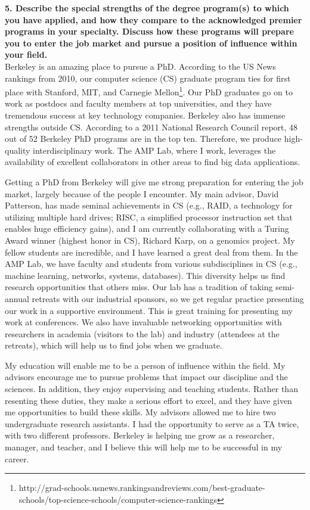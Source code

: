 \documentclass{article}
\begin{document}
\pagestyle{plain}

\noindent\textbf{5.  Describe the special strengths of the degree program(s) to which you have applied, and how they compare to the acknowledged premier programs in your specialty. Discuss how these programs will prepare you to enter the job market and pursue a position of influence within your field.}\\

Berkeley is an amazing place to pursue a PhD.
According to the US News rankings from 2010, our computer science (CS) graduate program ties for first place with Stanford, MIT, and Carnegie Mellon\footnote{http://grad-schools.usnews.rankingsandreviews.com/best-graduate-schools/top-science-schools/computer-science-rankings}.  
Our PhD graduates go on to work as postdocs and faculty members at top universities, and they have tremendous success at key technology companies.
Berkeley also has immense strengths outside CS.
According to a 2011 National Research Council report, 48 out of 52 Berkeley PhD programs are in the top ten.
Therefore, we produce high-quality interdisciplinary work.
The AMP Lab, where I work, leverages the availability of excellent collaborators in other areas to find big data applications.

Getting a PhD from Berkeley will give me strong preparation for entering the job market, largely because of the people I encounter.
My main advisor, David Patterson, has made seminal achievements in CS (e.g., RAID, a technology for utilizing multiple hard drives; RISC, a simplified processor instruction set that enables huge efficiency gains), and I am currently collaborating with a Turing Award winner (highest honor in CS), Richard Karp, on a genomics project.
My fellow students are incredible, and I have learned a great deal from them.
In the AMP Lab, we have faculty and students from various subdisciplines in CS (e.g., machine learning, networks, systems, databases).
This diversity helps us find research opportunities that others miss.
Our lab has a tradition of taking semi-annual retreats with our industrial sponsors, so we get regular practice presenting our work in a supportive environment.
This is great training for presenting my work at conferences.
We also have invaluable networking opportunities with researchers in academia (visitors to the lab) and industry (attendees at the retreats), which will help us to find jobs when we graduate.

My education will enable me to be a person of influence within the field.
My advisors encourage me to pursue problems that impact our discipline and the sciences.
In addition, they enjoy supervising and teaching students.
Rather than resenting these duties, they make a serious effort to excel, and they have given me opportunities to build these skills.
My advisors allowed me to hire two undergraduate research assistants.
I had the opportunity to serve as a TA twice, with two different professors.
Berkeley is helping me grow as a researcher, manager, and teacher, and I believe this will help me to be successful in my career.
\end{document}
